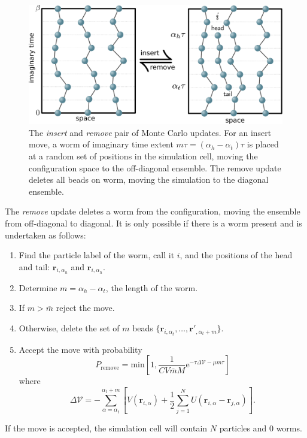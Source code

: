 \documentclass[prb,aps,amssym,nofootinbib,floatfix,notitlepage]{revtex4-1}
\renewcommand{\vec}[1]{\boldsymbol{#1}}
\newcommand{\e}[1]{\mathrm{e}^{#1}}
\begin{document}
\begin{figure}
\begin{center}
\includegraphics[width=0.70\columnwidth]{Figures/insertremove.pdf}
\end{center}
\caption{The \emph{insert} and \emph{remove} pair of Monte Carlo updates.  For
an insert move, a worm of imaginary time extent $m\tau = (\alpha_h -
\alpha_t)\tau$ is placed at a random set of positions in the simulation cell,
moving the configuration space to the off-diagonal ensemble.  The remove update
deletes all beads on worm, moving the simulation to the diagonal ensemble.} 
\label{fig:insertremove}
 \end{figure}
%

\noindent
The \emph{remove} update deletes a worm from the configuration, moving the
ensemble from off-diagonal to diagonal. It is only possible if there is a worm
present and is undertaken as follows:
\begin{enumerate}
    \item Find the particle label of the worm, call it $i$, and the positions
        of the head and tail: $\vec{r}_{i,\alpha_h}$ and
        $\vec{r}_{i,\alpha_h}$.
    \item Determine $m = \alpha_h - \alpha_t$, the length of the worm.
    \item If $m > \overline{m}$ reject the move.
    \item Otherwise, delete the set of $m$ beads $\{\vec{r}_{i,\alpha_t},\ldots,
    \vec{r}'_{,\alpha_t+m}\}$.
\item Accept the move with probability
\begin{equation}
    P_{\text{remove}} = \mathrm{min} \left[1,
    \frac{1}{C V \overline{m}M} \e{-\tau \Delta \mathcal{V} - \mu m \tau} \right]
\end{equation}
%
where
%
\begin{equation}
    \Delta\mathcal{V} = -\sum_{\alpha=\alpha_t}^{\alpha_t+m} \left[ 
        V(\vec{r}_{i,\alpha}) + \frac{1}{2}\sum_{j=1}^N
        U(\vec{r}_{i,\alpha}-\vec{r}_{j,\alpha}) \right].
\end{equation}
%
\end{enumerate}
If the move is accepted, the simulation cell will contain $N$ particles and 0
worms.
\end{document}
